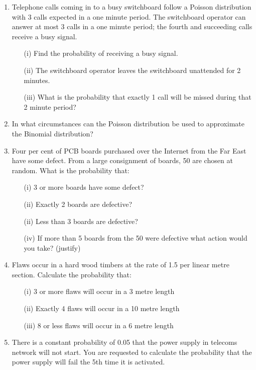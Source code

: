 \documentclass[a4paper,12pt]{article}
\begin{document}
\begin{enumerate}
\item Telephone calls coming in to a busy switchboard follow a Poisson distribution with 3 calls expected in a one minute period.  
The switchboard operator can answer at most 3 calls in a one minute period; the fourth and succeeding calls receive a busy signal.
\begin{itemize} 
\item[(i)]  	   Find the probability of receiving a busy signal.
\item[(ii)]  	   The switchboard operator leaves the switchboard unattended for 2 minutes.  
\item[(iii)]  What is the probability that exactly 1 call will be missed during that 2 minute period?
\end{itemize}       

\item In what circumstances can the Poisson distribution be used to approximate the Binomial distribution?
      


\item Four  per cent of PCB boards purchased over the Internet from the Far East have some defect.  
From a large consignment of boards, 50 are chosen at random.  
What is the probability that:
\begin{itemize}
\item[(i)]  	3 or more boards have some defect?
\item[(ii)]  	Exactly 2 boards are defective?
\item[(ii)]  	Less than 3 boards are defective?
\item[(iv)]  	If more than 5 boards from the 50 were defective what action would you take? (justify)
\end{itemize} 
\item Flaws occur in a hard wood timbers  at the rate of 1.5 per linear  metre section.  Calculate the probability that:
\begin{itemize}
\item[(i)]  	3 or more flaws will occur in a 3  metre length 
\item[(ii)]  	Exactly 4 flaws will occur in a 10 metre length
\item[(iii)]  	8 or less flaws will occur in a 6  metre length 
\end{itemize} 

\item There is a constant probability of 0.05  that the power supply in telecoms network will not start.  
You are requested to calculate the probability that the power supply will fail the 5th time it is activated.



\end{enumerate}
\end{document}
